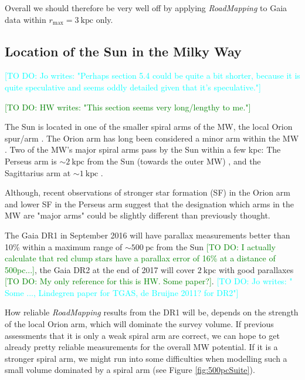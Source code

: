 \documentclass[iop,revtex4,numberedappendix,appendixfloats]{emulateapj}
\newcommand{\RM}{{\sl RoadMapping}}
\newcommand{\HW}[1]{\textcolor{Green}{#1}}
\newcommand{\Jo}[1]{\textcolor{Cyan}{#1}}
\begin{document}
Overall we should therefore be very well off by applying \RM{} to Gaia data within $r_\text{max}=3~\text{kpc}$ only.

\subsection{Location of the Sun in the Milky Way} \label{sec:discussion_sun_location}

\Jo{[TO DO: Jo writes: "Perhaps section 5.4 could be quite a bit shorter, because it is quite speculative and seems oddly detailed given that it's speculative."]}

\HW{[TO DO: HW writes: "This section seems very long/lengthy to me."]}

The Sun is located in one of the smaller spiral arms of the MW, the local Orion spur/arm \citep{1953ApJ...118..318M}. The Orion arm has long been considered a minor arm within the MW \citep{1985IAUS..106..335B}. Two of the MW's major spiral arms pass by the Sun within a few kpc: The Perseus arm is $\sim2~\text{kpc}$ from the Sun (towards the outer MW) \citep{2006Sci...311...54X}, and the Sagittarius arm at $\sim1~\text{kpc}$ \citep{2010PASJ...62..287S}. 

Although, recent observations of stronger star formation (SF) in the Orion arm \citep{2013ApJ...769...15X} and lower SF in the Perseus arm \citep{2013ApJ...775...79Z} suggest that the designation which arms in the MW are "major arms" could be slightly different than previously thought.

The Gaia DR1 in September 2016 will have parallax measurements better than 10\% within a maximum range of $\sim 500~\text{pc}$ from the Sun \citep{2015A&A...574A.115M} \HW{[TO DO: I actually calculate that red clump stars have a parallax error of 16\% at a distance of 500pc...]}, the Gaia DR2 at the end of 2017 will cover $2~\text{kpc}$ with good parallaxes \HW{[TO DO: My only reference for this is HW. Some paper?]}. \Jo{[TO DO: Jo writes: " Some ..., Lindegren paper for TGAS, de Bruijne 2011? for DR2"]}

How reliable \RM{} results from the DR1 will be, depends on the strength of the local Orion arm, which will dominate the survey volume. If previous assessments that it is only a weak spiral arm are correct, we can hope to get already pretty reliable measurements for the overall MW potential. If it is a stronger spiral arm, we might run into some difficulties when modelling such a small volume dominated by a spiral arm (see Figure \ref{fig:500pcSuite}).
\end{document}
